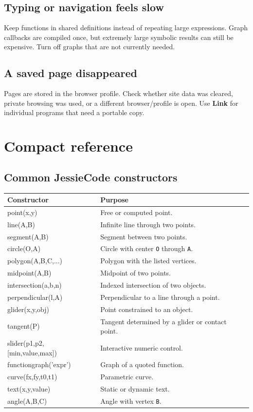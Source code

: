 \documentclass[11pt,a4paper]{article}
\newcommand{\ui}[1]{\textsf{\textbf{#1}}}
\newcommand{\code}[1]{\texttt{#1}}
\begin{document}
\subsection{Typing or navigation feels slow}

Keep functions in shared definitions instead of repeating large expressions. Graph callbacks are compiled once, but extremely large symbolic results can still be expensive. Turn off graphs that are not currently needed.

\subsection{A saved page disappeared}

Pages are stored in the browser profile. Check whether site data was cleared, private browsing was used, or a different browser/profile is open. Use \ui{Link} for individual programs that need a portable copy.

\section{Compact reference}

\subsection{Common JessieCode constructors}

\begin{tabularx}{\textwidth}{@{}>{\ttfamily}l X@{}}
\toprule
\normalfont\textbf{Constructor} & \textbf{Purpose} \\
\midrule
point(x,y) & Free or computed point. \\
line(A,B) & Infinite line through two points. \\
segment(A,B) & Segment between two points. \\
circle(O,A) & Circle with center \code{O} through \code{A}. \\
polygon(A,B,C,...) & Polygon with the listed vertices. \\
midpoint(A,B) & Midpoint of two points. \\
intersection(a,b,n) & Indexed intersection of two objects. \\
perpendicular(l,A) & Perpendicular to a line through a point. \\
glider(x,y,obj) & Point constrained to an object. \\
tangent(P) & Tangent determined by a glider or contact point. \\
slider(p1,p2,[min,value,max]) & Interactive numeric control. \\
functiongraph('expr') & Graph of a quoted function. \\
curve(fx,fy,t0,t1) & Parametric curve. \\
text(x,y,value) & Static or dynamic text. \\
angle(A,B,C) & Angle with vertex \code{B}. \\
\bottomrule
\end{tabularx}
\end{document}
